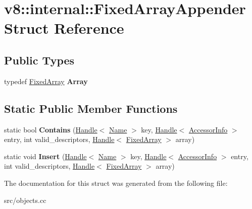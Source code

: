 \hypertarget{structv8_1_1internal_1_1_fixed_array_appender}{}\section{v8\+:\+:internal\+:\+:Fixed\+Array\+Appender Struct Reference}
\label{structv8_1_1internal_1_1_fixed_array_appender}
\subsection*{Public Types}
\begin{DoxyCompactItemize}
\item 
\hypertarget{structv8_1_1internal_1_1_fixed_array_appender_adb3f59da224416e436b53ec67a601bd1}{}typedef \hyperlink{classv8_1_1internal_1_1_fixed_array}{Fixed\+Array} {\bfseries Array}\label{structv8_1_1internal_1_1_fixed_array_appender_adb3f59da224416e436b53ec67a601bd1}

\end{DoxyCompactItemize}
\subsection*{Static Public Member Functions}
\begin{DoxyCompactItemize}
\item 
\hypertarget{structv8_1_1internal_1_1_fixed_array_appender_a70f29f6facceb66de5ea74bda9af2cc3}{}static bool {\bfseries Contains} (\hyperlink{classv8_1_1internal_1_1_handle}{Handle}$<$ \hyperlink{classv8_1_1internal_1_1_name}{Name} $>$ key, \hyperlink{classv8_1_1internal_1_1_handle}{Handle}$<$ \hyperlink{classv8_1_1internal_1_1_accessor_info}{Accessor\+Info} $>$ entry, int valid\+\_\+descriptors, \hyperlink{classv8_1_1internal_1_1_handle}{Handle}$<$ \hyperlink{classv8_1_1internal_1_1_fixed_array}{Fixed\+Array} $>$ array)\label{structv8_1_1internal_1_1_fixed_array_appender_a70f29f6facceb66de5ea74bda9af2cc3}

\item 
\hypertarget{structv8_1_1internal_1_1_fixed_array_appender_ac4fd1ec46faaefbcb8bd9200687986df}{}static void {\bfseries Insert} (\hyperlink{classv8_1_1internal_1_1_handle}{Handle}$<$ \hyperlink{classv8_1_1internal_1_1_name}{Name} $>$ key, \hyperlink{classv8_1_1internal_1_1_handle}{Handle}$<$ \hyperlink{classv8_1_1internal_1_1_accessor_info}{Accessor\+Info} $>$ entry, int valid\+\_\+descriptors, \hyperlink{classv8_1_1internal_1_1_handle}{Handle}$<$ \hyperlink{classv8_1_1internal_1_1_fixed_array}{Fixed\+Array} $>$ array)\label{structv8_1_1internal_1_1_fixed_array_appender_ac4fd1ec46faaefbcb8bd9200687986df}

\end{DoxyCompactItemize}


The documentation for this struct was generated from the following file\+:\begin{DoxyCompactItemize}
\item 
src/objects.\+cc\end{DoxyCompactItemize}
